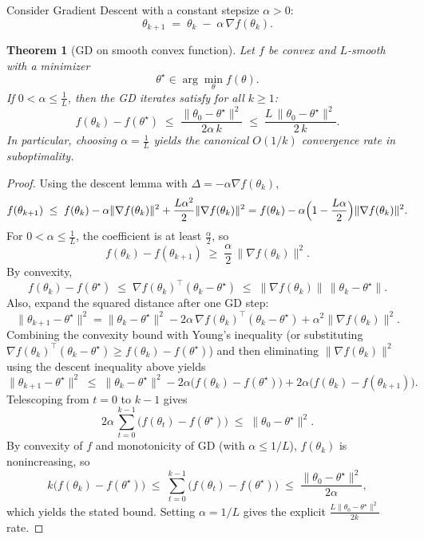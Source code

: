 \documentclass[
]{book}
\newtheorem{theorem}{Theorem}[chapter]
\theoremstyle{definition}
\theoremstyle{definition}
\theoremstyle{definition}
\theoremstyle{definition}
\theoremstyle{remark}
\begin{document}
Consider Gradient Descent with a constant stepsize \(\alpha>0\):
\[
\theta_{k+1} \;=\; \theta_k \;-\; \alpha\, \nabla f(\theta_k).
\]

\begin{theorem}[GD on smooth convex function]
\protect\hypertarget{thm:gd-convex-smooth}{}\label{thm:gd-convex-smooth}Let \(f\) be convex and \(L\)-smooth with a minimizer
\[
\theta^\star\in\arg\min_\theta f(\theta).
\]
If \(0<\alpha\le \frac{1}{L}\), then the GD iterates satisfy for all \(k\ge 1\):
\[
f(\theta_k) - f(\theta^\star)
\;\le\;
\frac{\|\theta_0-\theta^\star\|^2}{2\alpha\,k}
\;\le\;
\frac{L\,\|\theta_0-\theta^\star\|^2}{2\,k}.
\]
In particular, choosing \(\alpha=\frac{1}{L}\) yields the canonical \(O(1/k)\) convergence rate in suboptimality.
\end{theorem}

\begin{proof}
Using the descent lemma with \(\Delta=-\alpha \nabla f(\theta_k)\),
\[
f(\theta_{k+1}) \;\le\; f(\theta_k) - \alpha \|\nabla f(\theta_k)\|^2 + \frac{L\alpha^2}{2}\|\nabla f(\theta_k)\|^2
= f(\theta_k) - \alpha\Bigl(1-\frac{L\alpha}{2}\Bigr)\|\nabla f(\theta_k)\|^2.
\]
For \(0<\alpha\le \frac{1}{L}\), the coefficient is at least \(\frac{\alpha}{2}\), so
\[
f(\theta_k) - f(\theta_{k+1}) \;\ge\; \frac{\alpha}{2}\,\|\nabla f(\theta_k)\|^2.
\]
By convexity,
\[
f(\theta_k)-f(\theta^\star) \;\le\; \nabla f(\theta_k)^\top(\theta_k-\theta^\star)
\;\le\; \|\nabla f(\theta_k)\|\,\|\theta_k-\theta^\star\|.
\]
Also, expand the squared distance after one GD step:
\[
\|\theta_{k+1}-\theta^\star\|^2
= \|\theta_k-\theta^\star\|^2 - 2\alpha\,\nabla f(\theta_k)^\top(\theta_k-\theta^\star)
+ \alpha^2\|\nabla f(\theta_k)\|^2.
\]
Combining the convexity bound with Young's inequality (or substituting
\(\nabla f(\theta_k)^\top(\theta_k-\theta^\star)\ge f(\theta_k)-f(\theta^\star)\))
and then eliminating \(\|\nabla f(\theta_k)\|^2\) using the descent inequality above yields
\[
\|\theta_{k+1}-\theta^\star\|^2
\;\le\; \|\theta_k-\theta^\star\|^2 - 2\alpha\bigl(f(\theta_k)-f(\theta^\star)\bigr)
+ 2\alpha\bigl(f(\theta_k)-f(\theta_{k+1})\bigr).
\]
Telescoping from \(t=0\) to \(k-1\) gives
\[
2\alpha\,\sum_{t=0}^{k-1} \bigl(f(\theta_t)-f(\theta^\star)\bigr)
\;\le\; \|\theta_0-\theta^\star\|^2.
\]
By convexity of \(f\) and monotonicity of GD (with \(\alpha\le 1/L\)), \(f(\theta_k)\) is nonincreasing, so
\[
k\bigl(f(\theta_k)-f(\theta^\star)\bigr)
\;\le\; \sum_{t=0}^{k-1} \bigl(f(\theta_t)-f(\theta^\star)\bigr)
\;\le\; \frac{\|\theta_0-\theta^\star\|^2}{2\alpha},
\]
which yields the stated bound. Setting \(\alpha=1/L\) gives the explicit \(\frac{L\|\theta_0-\theta^\star\|^2}{2k}\) rate.
\end{proof}
\end{document}
